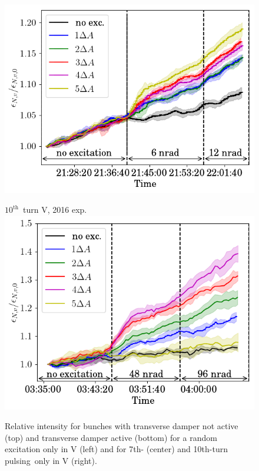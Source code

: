 \documentclass[%
 reprint,
 amsmath,amssymb,
 aps,
prstab,
longbibliography
]{revtex4-1}
\newcommand{\tenthtp}{10th-turn pulsing}
\begin{document}
\begin{figure}
\begin{minipage}[t]{0.32\linewidth}
		\includegraphics[height=0.75\linewidth]{2017_emitv_avg_rel_v7th_with_damper_no_text.png}
	\end{minipage}	
	\begin{minipage}[t]{0.32\linewidth}
		\centering
		$10^{\mathrm{th}}$~turn V, 2016 exp.\\
		\includegraphics[height=0.75\linewidth]{2016_emitv_avg_rel_v10th_with_damper_no_text.png}
	\end{minipage}	
	\caption{\label{fig:damp} Relative intensity for bunches with transverse damper not active (top) and transverse damper active (bottom) for a random excitation only in V (left) and for 7th- (center) and \tenthtp\ only in V (right).}
      \end{figure}
      
\end{document}
